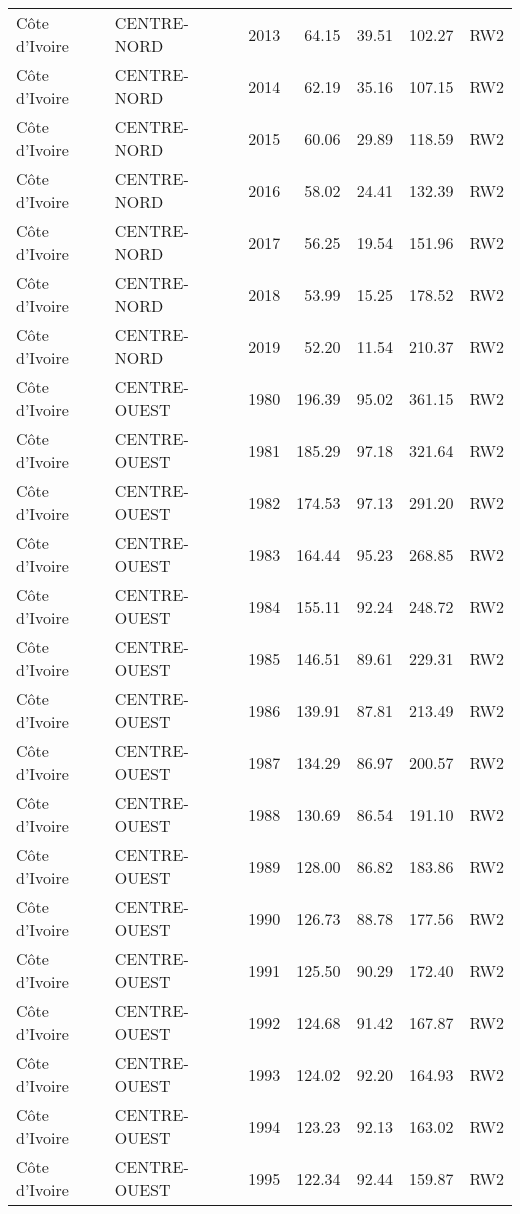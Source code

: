 \begin{longtable}{lllrrrl}
  C\^{o}te d'Ivoire & CENTRE-NORD & 2013 & 64.15 & 39.51 & 102.27 & RW2 \\ 
  C\^{o}te d'Ivoire & CENTRE-NORD & 2014 & 62.19 & 35.16 & 107.15 & RW2 \\ 
  C\^{o}te d'Ivoire & CENTRE-NORD & 2015 & 60.06 & 29.89 & 118.59 & RW2 \\ 
  C\^{o}te d'Ivoire & CENTRE-NORD & 2016 & 58.02 & 24.41 & 132.39 & RW2 \\ 
  C\^{o}te d'Ivoire & CENTRE-NORD & 2017 & 56.25 & 19.54 & 151.96 & RW2 \\ 
  C\^{o}te d'Ivoire & CENTRE-NORD & 2018 & 53.99 & 15.25 & 178.52 & RW2 \\ 
  C\^{o}te d'Ivoire & CENTRE-NORD & 2019 & 52.20 & 11.54 & 210.37 & RW2 \\ 
  C\^{o}te d'Ivoire & CENTRE-OUEST & 1980 & 196.39 & 95.02 & 361.15 & RW2 \\ 
  C\^{o}te d'Ivoire & CENTRE-OUEST & 1981 & 185.29 & 97.18 & 321.64 & RW2 \\ 
  C\^{o}te d'Ivoire & CENTRE-OUEST & 1982 & 174.53 & 97.13 & 291.20 & RW2 \\ 
  C\^{o}te d'Ivoire & CENTRE-OUEST & 1983 & 164.44 & 95.23 & 268.85 & RW2 \\ 
  C\^{o}te d'Ivoire & CENTRE-OUEST & 1984 & 155.11 & 92.24 & 248.72 & RW2 \\ 
  C\^{o}te d'Ivoire & CENTRE-OUEST & 1985 & 146.51 & 89.61 & 229.31 & RW2 \\ 
  C\^{o}te d'Ivoire & CENTRE-OUEST & 1986 & 139.91 & 87.81 & 213.49 & RW2 \\ 
  C\^{o}te d'Ivoire & CENTRE-OUEST & 1987 & 134.29 & 86.97 & 200.57 & RW2 \\ 
  C\^{o}te d'Ivoire & CENTRE-OUEST & 1988 & 130.69 & 86.54 & 191.10 & RW2 \\ 
  C\^{o}te d'Ivoire & CENTRE-OUEST & 1989 & 128.00 & 86.82 & 183.86 & RW2 \\ 
  C\^{o}te d'Ivoire & CENTRE-OUEST & 1990 & 126.73 & 88.78 & 177.56 & RW2 \\ 
  C\^{o}te d'Ivoire & CENTRE-OUEST & 1991 & 125.50 & 90.29 & 172.40 & RW2 \\ 
  C\^{o}te d'Ivoire & CENTRE-OUEST & 1992 & 124.68 & 91.42 & 167.87 & RW2 \\ 
  C\^{o}te d'Ivoire & CENTRE-OUEST & 1993 & 124.02 & 92.20 & 164.93 & RW2 \\ 
  C\^{o}te d'Ivoire & CENTRE-OUEST & 1994 & 123.23 & 92.13 & 163.02 & RW2 \\ 
  C\^{o}te d'Ivoire & CENTRE-OUEST & 1995 & 122.34 & 92.44 & 159.87 & RW2 \\ 

\end{longtable}
